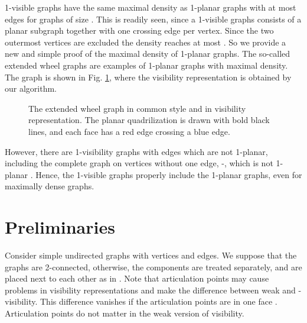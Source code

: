 \documentclass[runningheads]{llncs}
\begin{document}
 1-visible graphs have the same maximal density as
 1-planar graphs with at most  edges for graphs of size .
 This is readily seen, since a 1-visible graphs consists of a planar subgraph together
 with one crossing edge per vertex. Since the two
 outermost vertices are excluded the density reaches at most .
 So we provide a new and simple proof of the maximal density of
 1-planar graphs. The so-called  extended wheel graphs   \cite{bhw-1og-84} are examples
 of 1-planar graphs with maximal density.
The  graph is shown in Fig. \ref{XQ8}, where the visibility
representation is obtained by our algorithm.
\begin{figure}
  \centering
  \quad\quad
  \caption{The extended wheel graph  in common style and
  in visibility representation. The planar quadrilization is drawn with bold black lines,
  and each face has a red edge crossing a blue edge.
  \label{XQ8}}
\end{figure}
However, there are 1-visibility graphs with  edges which are  not
 1-planar,
 including the complete graph on  vertices without one edge, -,   which is not 1-planar
 \cite{bhw-1og-84,s-rm1pg-10}.
 Hence, the 1-visible graphs properly include the 1-planar graphs,
 even for maximally dense graphs.


\iffalse
 The vertex-edge crossings are a novel concept, which needs
further
  investigations, e.g., on the complexity of recognizing
1-visible graphs, on   unique 1-visible representations, on
 and strong 1-visibility and extensions to -visibility.

\fi



\section{Preliminaries}


Consider simple undirected graphs  with  vertices and
 edges. We suppose that the graphs are 2-connected, otherwise,
the components are treated separately, and are placed next to each
other as in \cite{TT-vrpg-86}. Note that  articulation points may
cause problems in visibility representations and make the difference
between weak and -visibility. This difference vanishes if
the articulation points are in one face \cite{TT-vrpg-86}.
Articulation points do not matter in the  weak version of
visibility.
\end{document}

